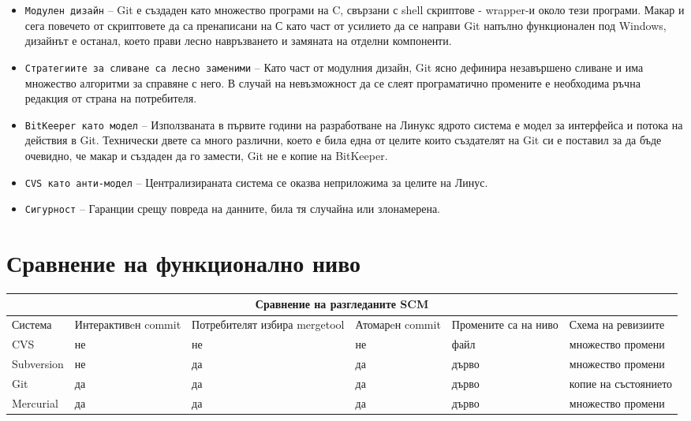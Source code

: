 \documentclass[a4paper]{article}
\begin{document}
\begin{itemize}
      \item \texttt{Модулен дизайн} -- Git е създаден като множество програми на C, свързани с shell скриптове - wrapper-и около тези програми. Макар и сега повечето от скриптовете да са пренаписани на С като част от усилието да се направи Git напълно функционален под Windows, дизайнът е останал, което прави лесно навръзването и замяната на отделни компоненти.
      \item \texttt{Стратегиите за сливане са лесно заменими} -- Като част от модулния дизайн, Git ясно дефинира незавършено сливане и има множество алгоритми за справяне с него. В случай на невъзможност да се слеят програматично промените е необходима ръчна редакция от страна на потребителя.
      \item \texttt{BitKeeper като модел} -- Използваната в първите години на разработване на Линукс ядрото система е модел за интерфейса и потока на действия в Git. Технически двете са много различни, което е била една от целите които създателят на Git си е поставил за да бъде очевидно, че макар и създаден да го замести, Git не е копие на BitKeeper.
      \item \texttt{CVS като анти-модел} -- Централизираната система се оказва неприложима за целите на Линус.
      \item \texttt{Сигурност} -- Гаранции срещу повреда на данните, била тя случайна или злонамерена.
    \end{itemize}

\section{Сравнение на функционално ниво}
  \begin{tabular} { | l | p{20 mm} | p{21 mm} | p{14 mm} | p{21 mm} | p{30 mm} |}
  \multicolumn{6}{c}{Сравнение на разгледаните SCM} \\
  \hline
  Система     & Интерактивeн commit & Потребителят избира mergetool & Атомарeн commit & Промените са на ниво & Схема на ревизиите \\
  \hline
  CVS         & не                  & не                            & не              & файл                 & множество промени \\
  Subversion  & не                  & да                            & да              & дърво                & множество промени \\
  Git         & да                  & да                            & да              & дърво                & копие на състоянието \\
  Mercurial   & да                  & да                            & да              & дърво                & множество промени\\
  \hline
  \end{tabular}
\end{document}
